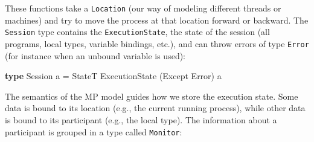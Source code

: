 \documentclass[runningheads,plain]{llncs}
\newenvironment{Shaded}{}{}
\newcommand{\KeywordTok}[1]{\textcolor[rgb]{0.00,0.44,0.13}{\textbf{#1}}}
\newcommand{\DataTypeTok}[1]{\textcolor[rgb]{0.56,0.13,0.00}{#1}}
\newcommand{\FunctionTok}[1]{\textcolor[rgb]{0.02,0.16,0.49}{#1}}
\newcommand{\NormalTok}[1]{#1}
\begin{document}
These functions take a \texttt{Location} (our way of modeling different
threads or machines) and try to move the process at that location
forward or backward. The \texttt{Session} type contains the
\texttt{ExecutionState}, the state of the session (all programs, local
types, variable bindings, etc.), and can throw errors of type
\texttt{Error} (for instance when an unbound variable is used):

\begin{Shaded}
\begin{Highlighting}[]
\KeywordTok{type} \DataTypeTok{Session}\NormalTok{ a }\FunctionTok{=} \DataTypeTok{StateT} \DataTypeTok{ExecutionState}\NormalTok{ (}\DataTypeTok{Except} \DataTypeTok{Error}\NormalTok{) a}
\end{Highlighting}
\end{Shaded}

The semantics of the MP model guides how we store the execution
state. Some data is bound to its location (e.g., the current running process), while other data is bound to its participant (e.g., the
local type).
The information about a participant is grouped in a type called
\texttt{Monitor}:
\end{document}
